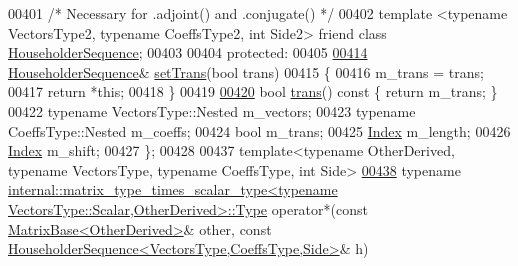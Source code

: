 \begin{DoxyCode}
00401     \textcolor{comment}{/* Necessary for .adjoint() and .conjugate() */}
00402     \textcolor{keyword}{template} <\textcolor{keyword}{typename} VectorsType2, \textcolor{keyword}{typename} CoeffsType2, \textcolor{keywordtype}{int} S\textcolor{keywordtype}{id}e2> \textcolor{keyword}{friend} \textcolor{keyword}{class }
      \hyperlink{group___householder___module_class_eigen_1_1_householder_sequence}{HouseholderSequence};
00403 
00404   \textcolor{keyword}{protected}:
00405 
\hyperlink{group___householder___module_ab8a9c969a9adcd392c9d481d6e9ccaef}{00414}     \hyperlink{group___householder___module_class_eigen_1_1_householder_sequence}{HouseholderSequence}& \hyperlink{group___householder___module_ab8a9c969a9adcd392c9d481d6e9ccaef}{setTrans}(\textcolor{keywordtype}{bool} trans)
00415     \{
00416       m\_trans = trans;
00417       \textcolor{keywordflow}{return} *\textcolor{keyword}{this};
00418     \}
00419 
\hyperlink{group___householder___module_ad61c9b10d95c26b7397ccb47f4d80b08}{00420}     \textcolor{keywordtype}{bool} \hyperlink{group___householder___module_ad61c9b10d95c26b7397ccb47f4d80b08}{trans}()\textcolor{keyword}{ const }\{ \textcolor{keywordflow}{return} m\_trans; \}     
00422     \textcolor{keyword}{typename} VectorsType::Nested m\_vectors;
00423     \textcolor{keyword}{typename} CoeffsType::Nested m\_coeffs;
00424     \textcolor{keywordtype}{bool} m\_trans;
00425     \hyperlink{group___core___module_a554f30542cc2316add4b1ea0a492ff02}{Index} m\_length;
00426     \hyperlink{group___core___module_a554f30542cc2316add4b1ea0a492ff02}{Index} m\_shift;
00427 \};
00428 
00437 \textcolor{keyword}{template}<\textcolor{keyword}{typename} OtherDerived, \textcolor{keyword}{typename} VectorsType, \textcolor{keyword}{typename} CoeffsType, \textcolor{keywordtype}{int} S\textcolor{keywordtype}{id}e>
\hyperlink{namespace_eigen_a6632b4f607fd51ab4560100fed76180f}{00438} \textcolor{keyword}{typename} 
      \hyperlink{group___core___module_class_eigen_1_1_matrix}{internal::matrix\_type\_times\_scalar\_type<typename VectorsType::Scalar,OtherDerived>::Type}
       operator*(\textcolor{keyword}{const} \hyperlink{group___core___module_class_eigen_1_1_matrix_base}{MatrixBase<OtherDerived>}& other, \textcolor{keyword}{const} 
      \hyperlink{group___householder___module_class_eigen_1_1_householder_sequence}{HouseholderSequence<VectorsType,CoeffsType,Side>}& h)

\end{DoxyCode}
